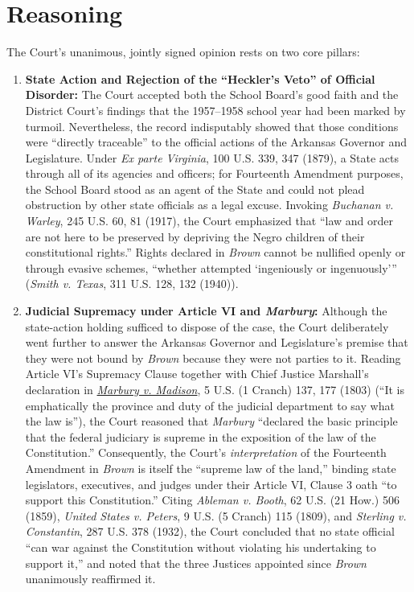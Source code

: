\documentclass[12pt]{article}
\begin{document}
\section{Reasoning}
The Court's unanimous, jointly signed opinion rests on two core pillars:
\begin{enumerate}
  \item \textbf{State Action and Rejection of the ``Heckler's Veto'' of Official Disorder:} The Court accepted both the School Board's good faith and the District Court's findings that the 1957--1958 school year had been marked by turmoil. Nevertheless, the record indisputably showed that those conditions were ``directly traceable'' to the official actions of the Arkansas Governor and Legislature. Under \textit{Ex parte Virginia}, 100 U.S. 339, 347 (1879), a State acts through all of its agencies and officers; for Fourteenth Amendment purposes, the School Board stood as an agent of the State and could not plead obstruction by other state officials as a legal excuse. Invoking \textit{Buchanan v. Warley}, 245 U.S. 60, 81 (1917), the Court emphasized that ``law and order are not here to be preserved by depriving the Negro children of their constitutional rights.'' Rights declared in \textit{Brown} cannot be nullified openly or through evasive schemes, ``whether attempted `ingeniously or ingenuously''' (\textit{Smith v. Texas}, 311 U.S. 128, 132 (1940)).
  \item \textbf{Judicial Supremacy under Article VI and \textit{Marbury}:} Although the state-action holding sufficed to dispose of the case, the Court deliberately went further to answer the Arkansas Governor and Legislature's premise that they were not bound by \textit{Brown} because they were not parties to it. Reading Article VI's Supremacy Clause together with Chief Justice Marshall's declaration in \href{https://supreme.justia.com/cases/federal/us/5/137/}{\textit{Marbury v. Madison}}, 5 U.S. (1 Cranch) 137, 177 (1803) (``It is emphatically the province and duty of the judicial department to say what the law is''), the Court reasoned that \textit{Marbury} ``declared the basic principle that the federal judiciary is supreme in the exposition of the law of the Constitution.'' Consequently, the Court's \emph{interpretation} of the Fourteenth Amendment in \textit{Brown} is itself the ``supreme law of the land,'' binding state legislators, executives, and judges under their Article VI, Clause 3 oath ``to support this Constitution.'' Citing \textit{Ableman v. Booth}, 62 U.S. (21 How.) 506 (1859), \textit{United States v. Peters}, 9 U.S. (5 Cranch) 115 (1809), and \textit{Sterling v. Constantin}, 287 U.S. 378 (1932), the Court concluded that no state official ``can war against the Constitution without violating his undertaking to support it,'' and noted that the three Justices appointed since \textit{Brown} unanimously reaffirmed it.
\end{enumerate}
\end{document}
